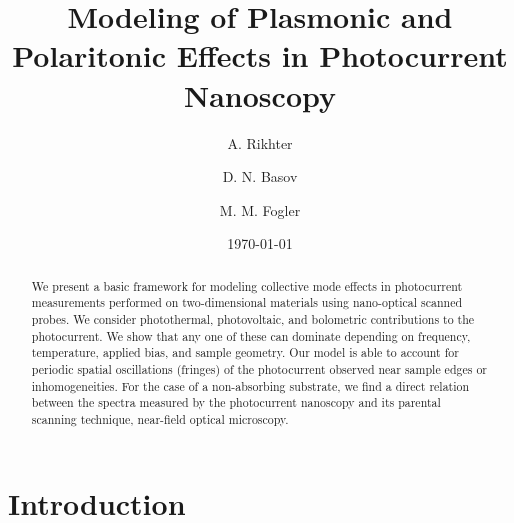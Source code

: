 \documentclass[aps, prb, reprint, superscriptaddress]{revtex4-2}
\date{\today}
\begin{document}
\begin{abstract}

We present a basic framework for modeling collective mode effects
in photocurrent measurements performed on two-dimensional materials using nano-optical scanned probes.
We consider photothermal, photovoltaic, and bolometric contributions to the photocurrent.
We show that any one of these can dominate depending on frequency, temperature, applied bias, and sample geometry. 
Our model is able to account for periodic spatial oscillations (fringes) of the photocurrent observed near sample edges or inhomogeneities. 
For the case of a non-absorbing substrate,
we find a direct relation between the
spectra measured by the photocurrent nanoscopy and its parental scanning technique,
near-field optical microscopy.

\end{abstract}

\title{Modeling of Plasmonic and Polaritonic Effects in Photocurrent Nanoscopy}

\author{A. Rikhter}

\author{D. N. Basov}

\author{M. M. Fogler}

\maketitle

\section{Introduction}
\label{sec:intro} 
\end{document}
